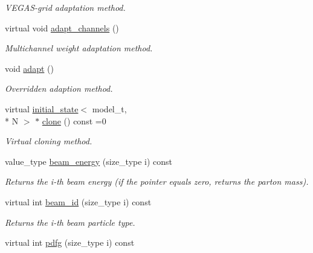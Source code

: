 \begin{DoxyCompactItemize}
\begin{DoxyCompactList}\small\item\em V\-E\-G\-A\-S-\/grid adaptation method. \end{DoxyCompactList}\item 
\hypertarget{a00304_a183e6b645115376f56ac2c6dfb129872}{virtual void \hyperlink{a00304_a183e6b645115376f56ac2c6dfb129872}{adapt\-\_\-channels} ()}\label{a00304_a183e6b645115376f56ac2c6dfb129872}

\begin{DoxyCompactList}\small\item\em Multichannel weight adaptation method. \end{DoxyCompactList}\item 
\hypertarget{a00304_afe33b79ffa3d873e89e561e881fc97fb}{void \hyperlink{a00304_afe33b79ffa3d873e89e561e881fc97fb}{adapt} ()}\label{a00304_afe33b79ffa3d873e89e561e881fc97fb}

\begin{DoxyCompactList}\small\item\em Overridden adaption method. \end{DoxyCompactList}\item 
\hypertarget{a00304_a80d888f5a90a43d37ec1248d1038ed98}{virtual \hyperlink{a00304}{initial\-\_\-state}$<$ model\-\_\-t, \\*
N $>$ $\ast$ \hyperlink{a00304_a80d888f5a90a43d37ec1248d1038ed98}{clone} () const =0}\label{a00304_a80d888f5a90a43d37ec1248d1038ed98}

\begin{DoxyCompactList}\small\item\em Virtual cloning method. \end{DoxyCompactList}\item 
value\-\_\-type \hyperlink{a00304_a0673c7ec9f4eee3c6e62ff7c04cb4cd9}{beam\-\_\-energy} (size\-\_\-type i) const 
\begin{DoxyCompactList}\small\item\em Returns the i-\/th beam energy (if the pointer equals zero, returns the parton mass). \end{DoxyCompactList}\item 
\hypertarget{a00304_ab96d05713defdc01e5ee6ee84f978831}{virtual int \hyperlink{a00304_ab96d05713defdc01e5ee6ee84f978831}{beam\-\_\-id} (size\-\_\-type i) const }\label{a00304_ab96d05713defdc01e5ee6ee84f978831}

\begin{DoxyCompactList}\small\item\em Returns the i-\/th beam particle type. \end{DoxyCompactList}\item 
\hypertarget{a00304_af83a627959bf9bb46ee15dd37d507f09}{virtual int \hyperlink{a00304_af83a627959bf9bb46ee15dd37d507f09}{pdfg} (size\-\_\-type i) const }\label{a00304_af83a627959bf9bb46ee15dd37d507f09}


\end{DoxyCompactItemize}
